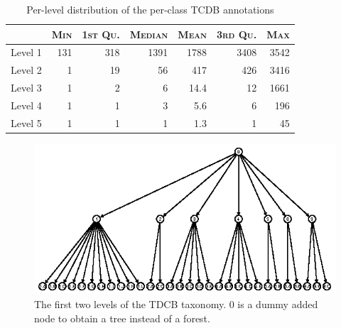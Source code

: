\documentclass[english]{article}
\begin{document}
\begin{table}[h!]
\caption {Per-level distribution of the per-class TCDB annotations}
\label{tab:distr-per-level}
\begin{center}
\begin{normalsize}
\begin{tabular}{|c|r|r|r|r|r|r|}
\hline
    	&  \textsc{Min}  & \textsc{1st Qu.}  & \textsc{Median} & \textsc{Mean} & \textsc{3rd Qu.}  &  \textsc{Max}\\  \hline
Level 1  &  131  &   318 &   1391 &   1788  &  3408  &  3542     \\ \hline 	
Level 2  &  1 &  19  & 56 & 417&  426& 3416     \\ \hline
Level 3  &  1 &   2 &   6 &  14.4 &  12& 1661    \\ \hline
Level 4  &  1 &  1&   3 &  5.6  & 6& 196    \\ \hline
Level 5  &  1 &  1  & 1 &  1.3 &  1 & 45    \\ \hline
\hline
\end{tabular}
\end{normalsize}
\end{center}
\end{table}


	



\begin{figure}[!h]

\includegraphics[width=15cm]{fig/TCDB2level.ps} 
\caption{The first two levels of the TDCB taxonomy. 0 is a dummy added node to obtain a tree instead of a forest.}
\label{fig:two-levels}
\end{figure}
\end{document}
